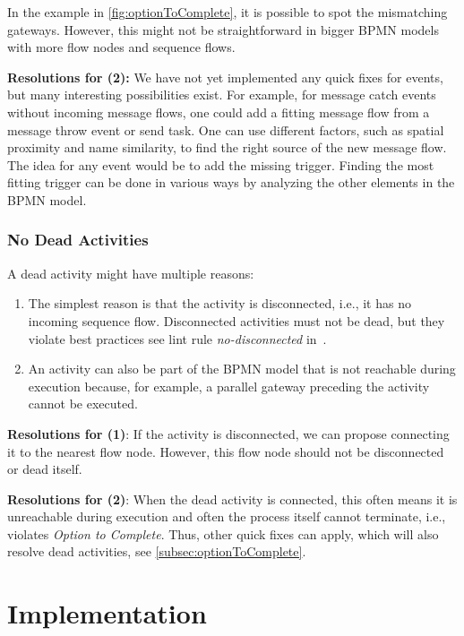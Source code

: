 \documentclass[runningheads]{llncs}
\begin{document}
In the example in \autoref{fig:optionToComplete}, it is possible to spot the mismatching gateways.
However, this might not be straightforward in bigger BPMN models with more flow nodes and sequence flows.

\textbf{Resolutions for (2):} We have not yet implemented any quick fixes for events, but many interesting possibilities exist.
For example, for message catch events without incoming message flows, one could add a fitting message flow from a message throw event or send task.
One can use different factors, such as spatial proximity and name similarity, to find the right source of the new message flow.
The idea for any event would be to add the missing trigger.
Finding the most fitting trigger can be done in various ways by analyzing the other elements in the BPMN model.


\subsubsection{No Dead Activities}
A dead activity might have multiple reasons:

\begin{enumerate}
	\item The simplest reason is that the activity is disconnected, i.e., it has no incoming sequence flow.
	Disconnected activities must not be dead, but they violate best practices see lint rule \textit{no-disconnected} in~\cite{camundaservicesgmbhBpmnlint2024}.
	\item An activity can also be part of the BPMN model that is not reachable during execution because, for example, a parallel gateway preceding the activity cannot be executed.
\end{enumerate}

\textbf{Resolutions for (1)}: If the activity is disconnected, we can propose connecting it to the nearest flow node.
However, this flow node should not be disconnected or dead itself.

\textbf{Resolutions for (2)}: When the dead activity is connected, this often means it is unreachable during execution and often the process itself cannot terminate, i.e., violates \textit{Option to Complete}.
Thus, other quick fixes can apply, which will also resolve dead activities, see \autoref{subsec:optionToComplete}.

\section{Implementation}
\end{document}

